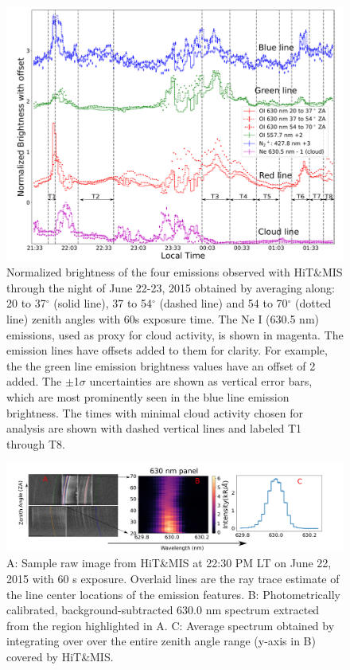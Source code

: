 \begin{figure}
	\centering\includegraphics[width=42pc]{nbgr.pdf}
	\caption{Normalized brightness of the four emissions observed with HiT\&MIS through the night of June 22-23, 2015 obtained by averaging along: 20 to 37$^\circ$ (solid line), 37 to 54$^\circ$ (dashed line) and 54 to 70$^\circ$ (dotted line) zenith angles with 60s exposure time. The Ne I (630.5 nm) emissions, used as proxy for cloud activity, is shown in magenta.  
		The emission lines have offsets added to them for clarity. For example, the the green line emission brightness values have an offset of 2 added. The $\pm$1$\sigma$ uncertainties are shown as vertical error bars, which are most prominently seen in the blue line emission brightness.
		The times with minimal cloud activity chosen for analysis are shown with dashed vertical lines and labeled T1 through T8.}
	\label{feature:nbrg}
\end{figure}
\begin{figure}[hp]
	\centering\includegraphics[width=40pc]{raw_spec.pdf}
	\caption{A: Sample raw image from HiT\&MIS at 22:30 PM LT on June 22, 2015 with 60 s exposure. Overlaid lines are the ray trace estimate of the line center locations of the emission features. B: Photometrically calibrated, background-subtracted 630.0 nm spectrum extracted from the region highlighted in A. C: Average spectrum obtained by integrating over 
		over the entire zenith angle range (y-axis in B) covered by HiT\&MIS.}
	\label{fig:raw}
\end{figure}

